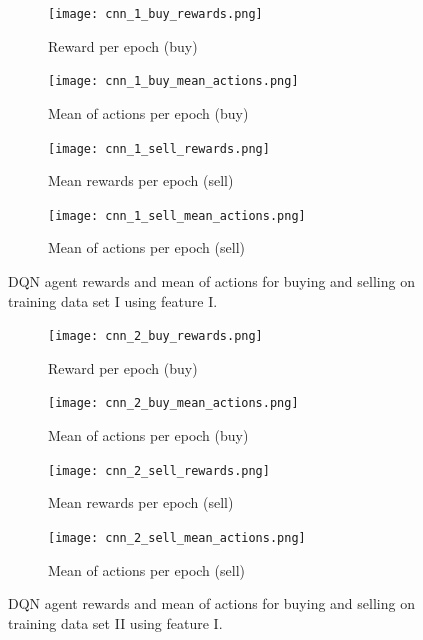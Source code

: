 \begin{figure}[H]
    \centering
    \begin{subfigure}[b]{0.45\textwidth}
        \texttt{[image: cnn\_1\_buy\_rewards.png]}
        \caption{Reward per epoch (buy)}
        \label{fig:analysis-dqn-1-reward-buy}
    \end{subfigure}
    \begin{subfigure}[b]{0.45\textwidth}
        \texttt{[image: cnn\_1\_buy\_mean\_actions.png]}
        \caption{Mean of actions per epoch (buy)}
        \label{fig:analysis-dqn-1-action-buy}
    \end{subfigure}
    \begin{subfigure}[b]{0.45\textwidth}
        \texttt{[image: cnn\_1\_sell\_rewards.png]}
        \caption{Mean rewards per epoch (sell)}
        \label{fig:analysis-dqn-1-reward-sell}
    \end{subfigure}
    \begin{subfigure}[b]{0.45\textwidth}
        \texttt{[image: cnn\_1\_sell\_mean\_actions.png]}
        \caption{Mean of actions per epoch (sell)}
        \label{fig:analysis-dqn-1-action-sell}
    \end{subfigure}
    \caption{DQN agent rewards and mean of actions for buying and selling on training data set I using feature I.}
    \label{fig:analysis-dqn-1}
\end{figure}

\begin{figure}[H]
    \centering
    \begin{subfigure}[b]{0.45\textwidth}
        \texttt{[image: cnn\_2\_buy\_rewards.png]}
        \caption{Reward per epoch (buy)}
        \label{fig:analysis-dqn-1-reward-buy}
    \end{subfigure}
    \begin{subfigure}[b]{0.45\textwidth}
        \texttt{[image: cnn\_2\_buy\_mean\_actions.png]}
        \caption{Mean of actions per epoch (buy)}
        \label{fig:analysis-dqn-1-action-buy}
    \end{subfigure}
    \begin{subfigure}[b]{0.45\textwidth}
        \texttt{[image: cnn\_2\_sell\_rewards.png]}
        \caption{Mean rewards per epoch (sell)}
        \label{fig:analysis-dqn-1-reward-sell}
    \end{subfigure}
    \begin{subfigure}[b]{0.45\textwidth}
        \texttt{[image: cnn\_2\_sell\_mean\_actions.png]}
        \caption{Mean of actions per epoch (sell)}
        \label{fig:analysis-dqn-1-action-sell}
    \end{subfigure}
    \caption{DQN agent rewards and mean of actions for buying and selling on training data set II using feature I.}
    \label{fig:analysis-dqn-2}
\end{figure}


